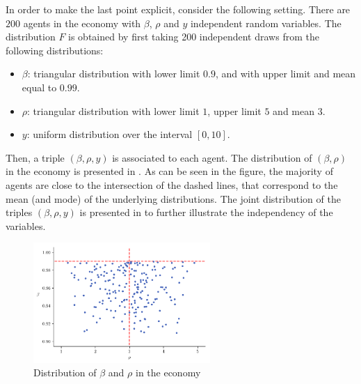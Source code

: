 \documentclass[english, a4paper, 12pt]{article}
\begin{document}
In order to make the last point explicit, consider the following setting. There are $200$ agents in the economy with $\beta$, $\rho$ and $y$ independent random variables. The distribution $F$ is obtained by first taking 200 independent draws from the following distributions:
	\begin{itemize}
		\item $\beta$: triangular distribution with lower limit $0.9$, and with upper limit and mean equal to $0.99$.
		\item $\rho$: triangular distribution with lower limit $1$, upper limit $5$ and mean $3$.
		\item $y$: uniform distribution over the interval $[0,10]$. 
	\end{itemize}

Then, a triple $(\beta,\rho,y)$ is associated to each agent. The distribution of $(\beta,\rho)$ in the economy is presented in . As can be seen in the figure, the majority of agents are close to the intersection of the dashed lines, that correspond to the mean (and mode) of the underlying distributions. The joint distribution of the triples $(\beta,\rho,y)$ is presented in  to further illustrate the independency of the variables.
	\vfill
	\begin{figure}[H]
		\caption{Distribution of $\beta$ and $\rho$ in the economy}
		\label{fig:distribBetaRho}
		\includegraphics[width=0.6\textwidth]{CarrollDistrib}
	\end{figure}
	\vfill
\newpage
\vfill	
\end{document}
